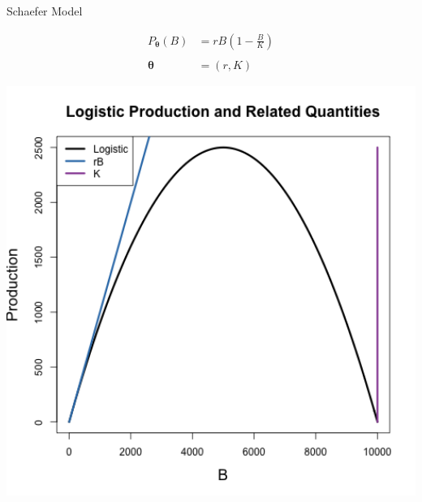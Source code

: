\documentclass[ xcolor = pdftex, dvipsnames, table ]{beamer}
\begin{document}
%
\begin{frame}{Schaefer Model}
\begin{minipage}[h!]{0.44\textwidth}
\begin{align*}
        P_{\bm{\theta}}(B) &= rB\left(1-\frac{B}{K}\right)\\
	~\\
        \bm{\theta} &= (r, K)
\end{align*}
\end{minipage}
\begin{minipage}[h!]{0.54\textwidth}
\includegraphics[width=1\textwidth]{../plots/srrSchaefferPar.png}
\end{minipage}
\end{frame}

\end{document}
